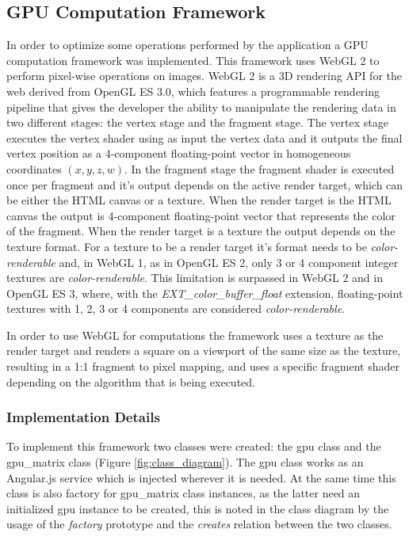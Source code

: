    \subsection {GPU Computation Framework} \label{sec:software:process:gpu} %
    
      In order to optimize some operations performed by the application a GPU computation framework was implemented. This framework uses WebGL 2 to perform pixel-wise operations on images. WebGL 2 is a 3D rendering API for the web derived from OpenGL ES 3.0, which features a programmable rendering pipeline that gives the developer the ability to manipulate the rendering data in two different stages: the vertex stage and the fragment stage. The vertex stage executes the vertex shader using as input the vertex data and it outputs the final vertex position as a 4-component floating-point vector in homogeneous coordinates $(x, y, z, w)$. In the fragment stage the fragment shader is executed once per fragment and it's output depends on the active render target, which can be either the HTML canvas or a texture. When the render target is the HTML canvas the output is 4-component floating-point vector that represents the color of the fragment. When the render target is a texture the output depends on the texture format. For a texture to be a render target it's format needs to be \textit{color-renderable} and, in WebGL 1, as in OpenGL ES 2, only 3 or 4 component integer textures are \textit{color-renderable}. This limitation is surpassed in WebGL 2 and in OpenGL ES 3, where, with the \textit{EXT\_color\_buffer\_float} extension, floating-point textures with 1, 2, 3 or 4 components are considered \textit{color-renderable}.
      
      In order to use WebGL for computations the framework uses a texture as the render target and renders a square on a viewport of the same size as the texture, resulting in a 1:1 fragment to pixel mapping, and uses a specific fragment shader depending on the algorithm that is being executed. 
      
      \subsubsection{Implementation Details}
      
        To implement this framework two classes were created: the gpu class and the gpu\_matrix class (Figure \ref{fig:class_diagram}). The gpu class works as an Angular.js service which is injected wherever it is needed. At the same time this class is also factory for gpu\_matrix class instances, as the latter need an initialized gpu instance to be created, this is noted in the class diagram by the usage of the \textit{factory} prototype and the \textit{creates} relation between the two classes.
        
